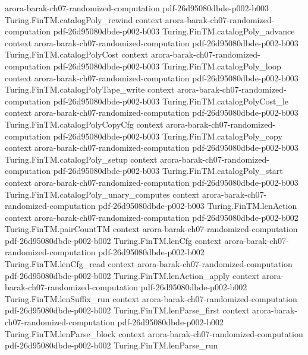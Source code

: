 \begin{theorem}
  {arora-barak-ch07-randomized-computation}
  {pdf-26d95080dbde-p002-b003}
\proofstep
  {Turing.FinTM.catalogPoly_rewind}
  {context}
  {arora-barak-ch07-randomized-computation}
  {pdf-26d95080dbde-p002-b003}
\proofstep
  {Turing.FinTM.catalogPoly_advance}
  {context}
  {arora-barak-ch07-randomized-computation}
  {pdf-26d95080dbde-p002-b003}
\proofstep
  {Turing.FinTM.catalogPolyCost}
  {context}
  {arora-barak-ch07-randomized-computation}
  {pdf-26d95080dbde-p002-b003}
\proofstep
  {Turing.FinTM.catalogPoly_loop}
  {context}
  {arora-barak-ch07-randomized-computation}
  {pdf-26d95080dbde-p002-b003}
\proofstep
  {Turing.FinTM.catalogPolyTape_write}
  {context}
  {arora-barak-ch07-randomized-computation}
  {pdf-26d95080dbde-p002-b003}
\proofstep
  {Turing.FinTM.catalogPolyCost_le}
  {context}
  {arora-barak-ch07-randomized-computation}
  {pdf-26d95080dbde-p002-b003}
\proofstep
  {Turing.FinTM.catalogPolyCopyCfg}
  {context}
  {arora-barak-ch07-randomized-computation}
  {pdf-26d95080dbde-p002-b003}
\proofstep
  {Turing.FinTM.catalogPoly_copy}
  {context}
  {arora-barak-ch07-randomized-computation}
  {pdf-26d95080dbde-p002-b003}
\proofstep
  {Turing.FinTM.catalogPoly_setup}
  {context}
  {arora-barak-ch07-randomized-computation}
  {pdf-26d95080dbde-p002-b003}
\proofstep
  {Turing.FinTM.catalogPoly_start}
  {context}
  {arora-barak-ch07-randomized-computation}
  {pdf-26d95080dbde-p002-b003}
\proofstep
  {Turing.FinTM.catalogPoly_unary_computes}
  {context}
  {arora-barak-ch07-randomized-computation}
  {pdf-26d95080dbde-p002-b003}
\proofstep
  {Turing.FinTM.lenAction}
  {context}
  {arora-barak-ch07-randomized-computation}
  {pdf-26d95080dbde-p002-b002}
\proofstep
  {Turing.FinTM.pairCountTM}
  {context}
  {arora-barak-ch07-randomized-computation}
  {pdf-26d95080dbde-p002-b002}
\proofstep
  {Turing.FinTM.lenCfg}
  {context}
  {arora-barak-ch07-randomized-computation}
  {pdf-26d95080dbde-p002-b002}
\proofstep
  {Turing.FinTM.lenCfg_read}
  {context}
  {arora-barak-ch07-randomized-computation}
  {pdf-26d95080dbde-p002-b002}
\proofstep
  {Turing.FinTM.lenAction_apply}
  {context}
  {arora-barak-ch07-randomized-computation}
  {pdf-26d95080dbde-p002-b002}
\proofstep
  {Turing.FinTM.lenSuffix_run}
  {context}
  {arora-barak-ch07-randomized-computation}
  {pdf-26d95080dbde-p002-b002}
\proofstep
  {Turing.FinTM.lenParse_first}
  {context}
  {arora-barak-ch07-randomized-computation}
  {pdf-26d95080dbde-p002-b002}
\proofstep
  {Turing.FinTM.lenParse_block}
  {context}
  {arora-barak-ch07-randomized-computation}
  {pdf-26d95080dbde-p002-b002}
\proofstep
  {Turing.FinTM.lenParse_run}

\end{theorem}
